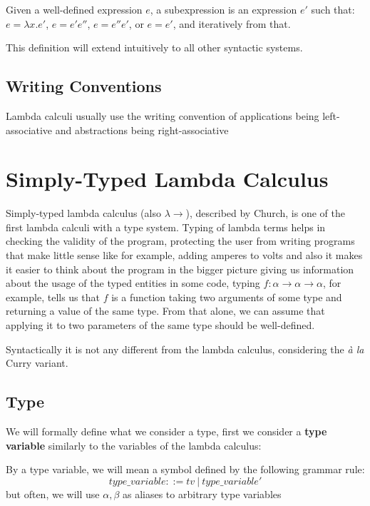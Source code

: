 \begin{defn}[Subexpression]
Given a well-defined expression $e$, a subexpression is an expression $e'$ such that: $e = \lambda x . e'$, $e = e' e''$, $e = e'' e'$, or $e = e'$, and iteratively from that.
\end{defn}

This definition will extend intuitively to all other syntactic systems.

\subsection{Writing Conventions}

Lambda calculi usually use the writing convention of applications being left-associative and abstractions being right-associative


\section{Simply-Typed Lambda Calculus }

Simply-typed lambda calculus (also $\lambda\rightarrow$), described by Church, is one of the first lambda calculi with a type system. Typing of lambda terms helps in checking the validity of the program, protecting the user from writing programs that make little sense like for example, adding amperes to volts \cite{barendregt1992lambda} and also it makes it easier to think about the program in the bigger picture giving us information about the usage of the typed entities in some code, typing $f : \alpha \rightarrow \alpha \rightarrow \alpha$, for example, tells us that $f$ is a function taking two arguments of some type and returning a value of the same type. From that alone, we can assume that applying it to two parameters of the same type should be well-defined.

Syntactically it is not any different from the lambda calculus, considering the \emph{\`a la} Curry variant. \cite{barendregt1992lambda}

\subsection{Type}

We will formally define what we consider a type, first we consider a \textbf{type variable} similarly to the variables of the lambda calculus:

\begin{defn}
    By a type variable, we will mean a symbol defined by the following grammar rule:
    $$type\_variable ::= tv\ |\ type\_variable'$$
    but often, we will use $\alpha, \beta$ as aliases to arbitrary type variables
\end{defn}

